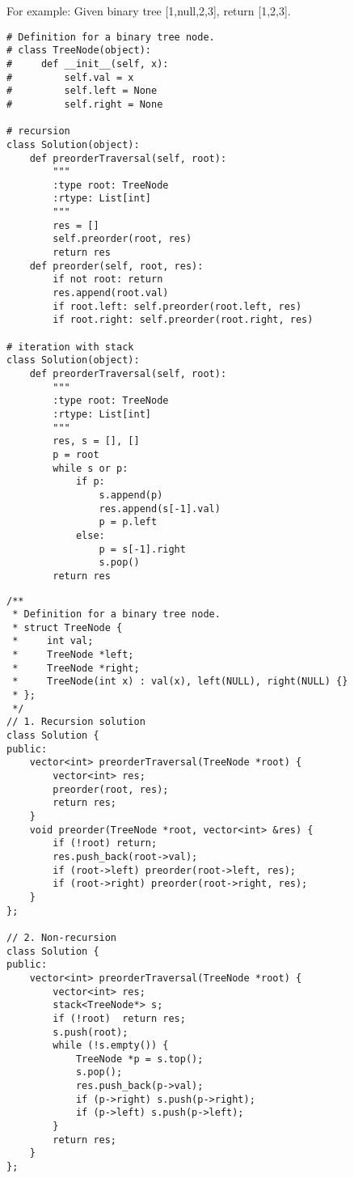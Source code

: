 For example: Given binary tree [1,null,2,3], return [1,2,3]. \\

\begin{lstlisting}
# Definition for a binary tree node.
# class TreeNode(object):
#     def __init__(self, x):
#         self.val = x
#         self.left = None
#         self.right = None

# recursion
class Solution(object):
    def preorderTraversal(self, root):
        """
        :type root: TreeNode
        :rtype: List[int]
        """
        res = []
        self.preorder(root, res)
        return res
    def preorder(self, root, res):
        if not root: return
        res.append(root.val)
        if root.left: self.preorder(root.left, res)
        if root.right: self.preorder(root.right, res)
        
# iteration with stack
class Solution(object):
    def preorderTraversal(self, root):
        """
        :type root: TreeNode
        :rtype: List[int]
        """
        res, s = [], []
        p = root
        while s or p:
            if p:
                s.append(p)
                res.append(s[-1].val)
                p = p.left
            else:
                p = s[-1].right
                s.pop()
        return res
\end{lstlisting}

\begin{lstlisting}
/**
 * Definition for a binary tree node.
 * struct TreeNode {
 *     int val;
 *     TreeNode *left;
 *     TreeNode *right;
 *     TreeNode(int x) : val(x), left(NULL), right(NULL) {}
 * };
 */
// 1. Recursion solution
class Solution {
public:
    vector<int> preorderTraversal(TreeNode *root) {
        vector<int> res;
        preorder(root, res);
        return res;
    }
    void preorder(TreeNode *root, vector<int> &res) {
        if (!root) return;
        res.push_back(root->val);
        if (root->left) preorder(root->left, res);
        if (root->right) preorder(root->right, res);
    }
};

// 2. Non-recursion
class Solution {
public:
    vector<int> preorderTraversal(TreeNode *root) {
        vector<int> res;
        stack<TreeNode*> s;
        if (!root)  return res;
        s.push(root);
        while (!s.empty()) {
            TreeNode *p = s.top();
            s.pop();
            res.push_back(p->val);
            if (p->right) s.push(p->right);
            if (p->left) s.push(p->left);
        }
        return res;
    }
};
\end{lstlisting}


